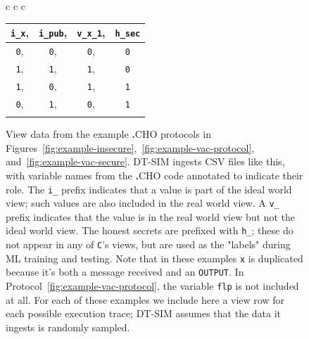 \documentclass[acmlarge, manuscript, screen, review, anonymous, table]{acmart}
\newcommand{\icONE}[1][cho]{\inlinecode[#1]{1}}
\newcommand{\iczed}[1][cho]{\inlinecode[#1]{0}}
\newcommand{\inlinecode}[2][cho]{\lstinline[language=#1]{#2}}
\newcommand{\langname}{\textsc{\textbf{.}CHO}\xspace}
\newcommand{\toolname}{\textsc{DT-SIM}\xspace}
\begin{document}
\begin{figure}[tbhp]
\begin{tabular}{c c c}
\begin{tabular}[b]{| >{\columncolor{ideal}}c >{\columncolor{ideal}}c >{\columncolor{real}}c >{\columncolor{secret}}c |}
    \hline
        \inlinecode{i_x},& \inlinecode{i_pub},& \inlinecode{v_x_1},& \inlinecode{h_sec} \\
    \hline
        \iczed,&           \iczed,&               \iczed,&             \iczed\\
        \icONE,&           \icONE,&               \icONE,&             \iczed\\
        \icONE,&           \iczed,&               \icONE,&             \icONE\\
        \iczed,&           \icONE,&               \iczed,&             \icONE\\
    \hline
        \multicolumn{4}{c}{\textit{(c.)} Protocol~\ref{fig:example-vac-secure}}
    \end{tabular}
  \end{tabular}
    \caption{View data from the example \langname protocols in
    Figures~\ref{fig:example-insecure},~\ref{fig:example-vac-protocol}, and~\ref{fig:example-vac-secure}.
    \toolname ingests CSV files like this, with variable names from the \langname code annotated to indicate their role.
    The \inlinecode{i_} prefix indicates that a value is part of the ideal world view; such values are also included in the real world view.
    A \inlinecode{v_} prefix indicates that the value is in the real world view but not the ideal world view.
    The honest secrets are prefixed with \inlinecode{h_}; these do not appear in any of \inlinecode{C}'s views,
    but are used as the "labels" during ML training and testing.
    Note that in these examples \inlinecode{x} is duplicated because it's both a message received and an \inlinecode{OUTPUT}.
    In Protocol~\ref{fig:example-vac-protocol}, the variable \inlinecode{flp} is not included at all.
    For each of these examples we include here a view row for each possible execution trace;
    \toolname assumes that the data it ingests is randomly sampled.}
  \label{fig:views}
\end{figure}
\end{document}
